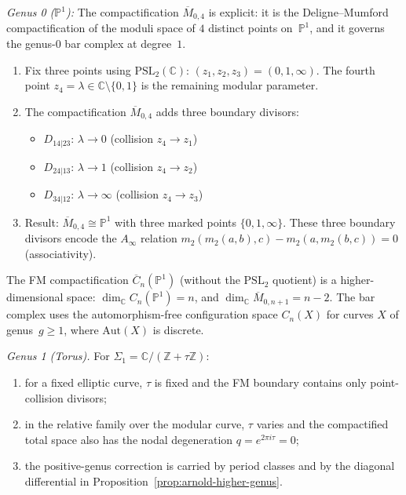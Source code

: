 \begin{example}\label{ex:config-genera}
\emph{Genus 0 ($\mathbb{P}^1$):} The compactification $\overline{M}_{0,4}$ is explicit: it is the Deligne--Mumford compactification of the moduli space of $4$ distinct points on~$\mathbb{P}^1$, and it governs the genus-$0$ bar complex at degree~$1$.
\begin{enumerate}
\item Fix three points using $\mathrm{PSL}_2(\mathbb{C})$: $(z_1, z_2, z_3) = (0, 1, \infty)$. The fourth point $z_4 = \lambda \in \mathbb{C} \setminus \{0,1\}$ is the remaining modular parameter.

\item The compactification $\overline{M}_{0,4}$ adds three boundary divisors:
 \begin{itemize}
 \item $D_{14|23}$: $\lambda \to 0$ (collision $z_4 \to z_1$)
 \item $D_{24|13}$: $\lambda \to 1$ (collision $z_4 \to z_2$)
 \item $D_{34|12}$: $\lambda \to \infty$ (collision $z_4 \to z_3$)
 \end{itemize}

\item Result: $\overline{M}_{0,4} \cong \mathbb{P}^1$ with three marked points $\{0, 1, \infty\}$. These three boundary divisors encode the $A_\infty$ relation $m_2(m_2(a,b),c) - m_2(a, m_2(b,c)) = 0$ (associativity).
\end{enumerate}

\begin{remark}
The FM compactification $\overline{C}_n(\mathbb{P}^1)$ (without the $\mathrm{PSL}_2$ quotient) is a higher-dimensional space: $\dim_{\mathbb{C}} C_n(\mathbb{P}^1) = n$, and $\dim_{\mathbb{C}} \overline{M}_{0,n+1} = n - 2$. The bar complex uses the automorphism-free configuration space $C_n(X)$ for curves $X$ of genus~$g \geq 1$, where $\mathrm{Aut}(X)$ is discrete.
\end{remark}

\emph{Genus 1 (Torus).} For $\Sigma_1 = \mathbb{C}/(\mathbb{Z} + \tau\mathbb{Z})$:
\begin{enumerate}
\item for a fixed elliptic curve, $\tau$ is fixed and the FM boundary
contains only point-collision divisors;
\item in the relative family over the modular curve, $\tau$ varies and
the compactified total space also has the nodal degeneration
$q=e^{2\pi i\tau}=0$;
\item the positive-genus correction is carried by period classes and by
the diagonal differential in Proposition~\ref{prop:arnold-higher-genus}.
\end{enumerate}


\end{example}
